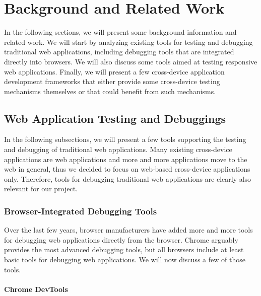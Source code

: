\chapter{Background and Related Work}

In the following sections, we will present some background information and related work. We will start by analyzing existing tools for testing and debugging traditional web applications, including debugging tools that are integrated directly into browsers. We will also discuss some tools aimed at testing responsive web applications. Finally, we will present a few cross-device application development frameworks that either provide some cross-device testing mechanisms themselves or that could benefit from such mechanisms.

\section{Web Application Testing and Debuggings}

In the following subsections, we will present a few tools supporting the testing and debugging of traditional web applications. Many existing cross-device applications are web applications and more and more applications move to the web in general, thus we decided to focus on web-based cross-device applications only. Therefore, tools for debugging traditional web applications are clearly also relevant for our project.

\subsection{Browser-Integrated Debugging Tools}

Over the last few years, browser manufacturers have added more and more tools for debugging web applications directly from the browser. Chrome arguably provides the most advanced debugging tools, but all browsers include at least basic tools for debugging web applications. We will now discuss a few of those tools.

\subsubsection{Chrome DevTools}

